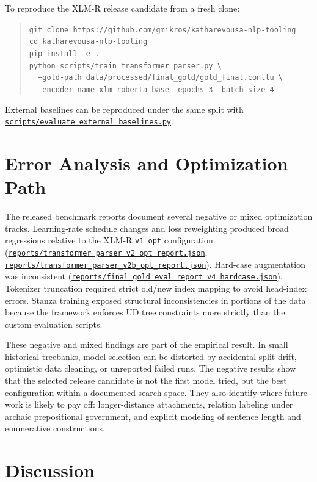 \documentclass[11pt]{article}
\newcommand{\repobase}{https://github.com/gmikros/katharevousa-nlp-tooling}
\newcommand{\repofile}[1]{\href{\repobase/blob/main/#1}{\nolinkurl{#1}}}
\begin{document}
To reproduce the XLM-R release candidate from a fresh clone:

\begin{quote}
\texttt{git clone \repobase} \\
\texttt{cd katharevousa-nlp-tooling} \\
\texttt{pip install -e .} \\
\texttt{python scripts/train\_transformer\_parser.py \textbackslash} \\
\texttt{\ \ --gold-path data/processed/final\_gold/gold\_final.conllu \textbackslash} \\
\texttt{\ \ --encoder-name xlm-roberta-base --epochs 3 --batch-size 4}
\end{quote}

\noindent External baselines can be reproduced under the same split with \repofile{scripts/evaluate_external_baselines.py}.

\section{Error Analysis and Optimization Path}

The released benchmark reports document several negative or mixed optimization tracks. Learning-rate schedule changes and loss reweighting produced broad regressions relative to the XLM-R \texttt{v1\_opt} configuration (\repofile{reports/transformer_parser_v2_opt_report.json}, \repofile{reports/transformer_parser_v2b_opt_report.json}). Hard-case augmentation was inconsistent (\repofile{reports/final_gold_eval_report_v4_hardcase.json}). Tokenizer truncation required strict old/new index mapping to avoid head-index errors. Stanza training exposed structural inconsistencies in portions of the data because the framework enforces UD tree constraints more strictly than the custom evaluation scripts.

These negative and mixed findings are part of the empirical result. In small historical treebanks, model selection can be distorted by accidental split drift, optimistic data cleaning, or unreported failed runs. The negative results show that the selected release candidate is not the first model tried, but the best configuration within a documented search space. They also identify where future work is likely to pay off: longer-distance attachments, relation labeling under archaic prepositional government, and explicit modeling of sentence length and enumerative constructions.

\section{Discussion}
\end{document}
